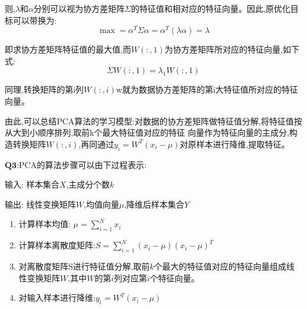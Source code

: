 \documentclass[homework]{IEEEtran}
\begin{document}
\begin{CJK}{UTF8}{gkai}
则,$\lambda$和$\alpha$分别可以视为协方差矩阵$\Sigma$的特征值和相对应的特征向量。因此,原优化目标可以带换为:
$$
\max =  \alpha^T \Sigma \alpha =\alpha^T(\lambda \alpha) = \lambda
$$\par
即求协方差矩阵特征值的最大值,而$W(:,1)$为协方差矩阵所对应的特征向量,如下式:
$$
\Sigma W(:,1)=\lambda_1 W(:,1)
$$\par
同理,转换矩阵的第i列$W(:,i)$w就为数据协方差矩阵的第i大特征值所对应的特征向量。\par
由此,可以总结PCA算法的学习模型:对数据的协方差矩阵做特征值分解,将特征值按从大到小顺序排列,取前k个最大特征值对应的特征
向量作为特征向量的主成分,构造转换矩阵$W(:,i)$,再同通过$y_{i}=W^{T}\left(x_{i}-\mu\right)$对原样本进行降维,提取特征。\par
$\mathbf{Q3}$:PCA的算法步骤可以由下过程表示: \par
输入: 样本集合$X$,主成分个数$k$ \par
输出: 线性变换矩阵$W$,均值向量$\mu$,降维后样本集合$Y$ \par
\begin{enumerate}
\item 计算样本均值: $ \mu=\sum_{i=1}^{N} x_{i} $
\item 计算样本离散度矩阵:$S=\sum_{i=1}^{N}\left(x_{i}-\mu\right)\left(x_{i}-\mu\right)^{T}$ 
\item 对离散度矩阵$\mathrm{S}$进行特征值分解,取前$k$个最大的特征值对应的特征向量组成线性变换矩阵$W$,其中$W$的第$i$列对应第$i$个特征向量。
\item 对输入样本进行降维:$y_{i}=W^{T}\left(x_{i}-\mu\right) $
\end{enumerate}


\end{CJK}
\end{document}
